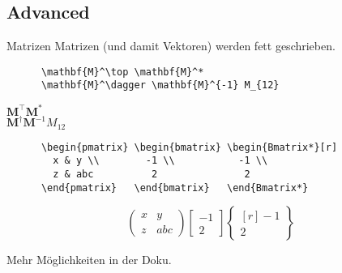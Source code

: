 \subsection{Advanced}

\begin{frame}[fragile]{
  Matrizen
  \hfill{}
}
  Matrizen (und damit Vektoren) werden fett geschrieben.
  \begin{CodeExample}{0.70}
    \begin{lstlisting}
      \mathbf{M}^\top \mathbf{M}^*
      \mathbf{M}^\dagger \mathbf{M}^{-1} M_{12}
    \end{lstlisting}
  \CodeResult
    $\mathbf{M}^\top \mathbf{M}^*$ \\
    $\mathbf{M}^\dagger \mathbf{M}^{-1} M_{12}$
  \end{CodeExample}

  \fontsize{8}{6}
  \begin{CodeExample}{0.70}
    \begin{lstlisting}
      \begin{pmatrix} \begin{bmatrix} \begin{Bmatrix*}[r]
        x & y \\        -1 \\           -1 \\
        z & abc          2               2
      \end{pmatrix}   \end{bmatrix}   \end{Bmatrix*}
    \end{lstlisting}
  \CodeResult
    \begin{equation*}
      \begin{pmatrix}
        x & y \\
        z & abc
      \end{pmatrix}
      \begin{bmatrix}
        -1 \\
         2
      \end{bmatrix}
      \begin{Bmatrix*}[r]
        -1 \\
         2
      \end{Bmatrix*}
    \end{equation*}
  \end{CodeExample}

  \vspace{1em}
  Mehr Möglichkeiten in der Doku.
\end{frame}

